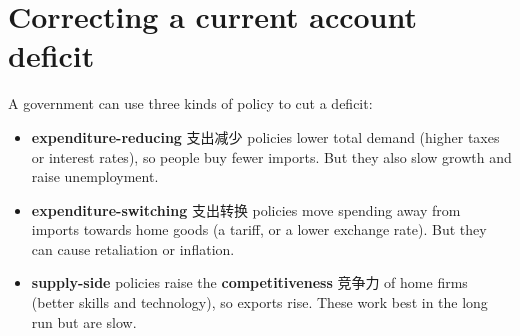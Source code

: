 \documentclass[11pt]{article}
\begin{document}
\section*{Correcting a current account deficit}

A government can use three kinds of policy to cut a deficit:

\begin{itemize}
\item \textbf{expenditure-reducing} 支出减少 policies lower total demand (higher taxes or interest rates), so people buy fewer imports. But they also slow growth and raise unemployment.

\item \textbf{expenditure-switching} 支出转换 policies move spending away from imports towards home goods (a tariff, or a lower exchange rate). But they can cause retaliation or inflation.

\item \textbf{supply-side} policies raise the \textbf{competitiveness} 竞争力 of home firms (better skills and technology), so exports rise. These work best in the long run but are slow.

\end{itemize}
\end{document}
